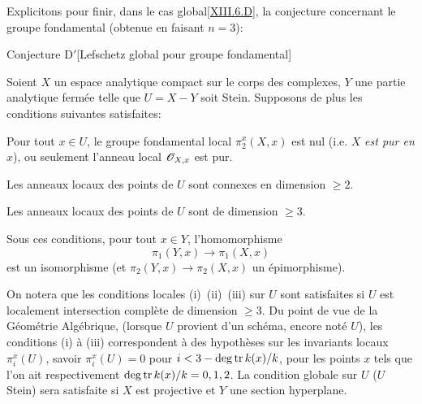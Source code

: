 Explicitons pour finir, dans le \og cas global\fg \ref{XIII.6.D}, la conjecture concernant le groupe fondamental (obtenue en faisant $n=3$):


\label{XIII.6.D'}
\begin{enonce*}{Conjecture D$\boldsymbol'$}[Lefschetz global pour groupe fondamental\ndemark]

Soient $X$ un espace analytique compact sur le corps des complexes, $Y$ une partie analytique ferm\'ee telle que $U=X-Y$ soit Stein. Supposons de plus les conditions suivantes satisfaites:
\begin{enumeratei}
\item
Pour tout $x\in U$, le groupe fondamental local $\pi_2^x(X, x)$ est nul (i.e. $X$ \emph{est \og pur en }$x${\fg}), ou seulement l'anneau local $\mathscr{O}_{X, x}$ est pur.
\item
Les anneaux locaux des points de $U$ sont \og connexes en dimension $\geq 2$\fg.
\item
Les anneaux locaux des points de $U$ sont de dimension $\geq 3$.
\end{enumeratei}

Sous ces conditions, pour tout $x\in Y$, l'homomorphisme
$$
\pi_1(Y, x)\to\pi_1(X, x)
$$
est un isomorphisme (et $\pi_2(Y, x)\to\pi_2(X, x)$ un \'epimorphisme).
\end{enonce*}

On notera que les conditions locales (i)~(ii)~(iii) sur $U$ sont satisfaites si $U$ est localement intersection compl\`ete de dimension $\geq 3$. Du point de vue de la G\'eom\'etrie Alg\'ebrique, (lorsque $U$ provient d'un sch\'ema, encore not\'e $U$), les conditions (i) \`a (iii) correspondent \`a des hypoth\`eses sur les invariants locaux $\pi_i^x(U)$, \ignorespaces savoir \hbox{$\pi_i^x(U)=0$} pour $i<3-\operatorname{deg\,tr} k(x)/k$, pour les points $x$ tels que l'on ait respectivement $\operatorname{deg\,tr} k(x)/k=0, 1, 2$. La condition globale sur $U$ ($U$ Stein) sera satisfaite si $X$ est projective et $Y$ une section hyperplane.

